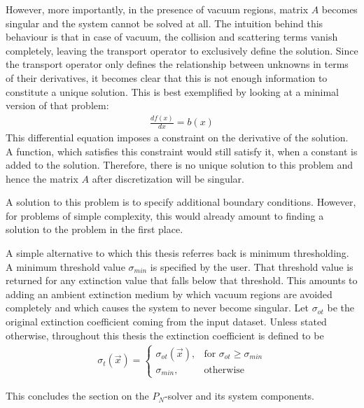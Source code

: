 However, more importantly, in the presence of vacuum regions, matrix $A$ becomes singular and the system cannot be solved at all. The intuition behind this behaviour is that in case of vacuum, the collision and scattering terms vanish completely, leaving the transport operator to exclusively define the solution. Since the transport operator only defines the relationship between unknowns in terms of their derivatives, it becomes clear that this is not enough information to constitute a unique solution. This is best exemplified by looking at a minimal version of that problem:
\begin{align*}
\frac{df\left(x\right)}{dx} = b\left(x\right)
\end{align*}
This differential equation imposes a constraint on the derivative of the solution. A function, which satisfies this constraint would still satisfy it, when a constant is added to the solution. Therefore, there is no unique solution to this problem and hence the matrix $A$ after discretization will be singular.

A solution to this problem is to specify additional boundary conditions. However, for problems of simple complexity, this would already amount to finding a solution to the problem in the first place.

A simple alternative to which this thesis referres back is minimum thresholding. A minimum threshold value $\sigma_{min}$ is specified by the user. That threshold value is returned for any extinction value that falls below that threshold. This amounts to adding an ambient extinction medium by which vacuum regions are avoided completely and which causes the system to never become singular. Let $\sigma_{ot}$ be the original extinction coefficient coming from the input dataset. Unless stated otherwise, throughout this thesis the extinction coefficient is defined to be
\begin{align}
\label{eq:pn_solver_minimum_threshold}
\sigma_t\left(\vec{x}\right) =
\begin{cases}
\sigma_{ot}\left(\vec{x}\right), & \text{for $\sigma_{ot}\ge\sigma_{min}$}
\\
\sigma_{min}, & \text{otherwise}
\end{cases}
\end{align}

This concludes the section on the $P_N$-solver and its system components.